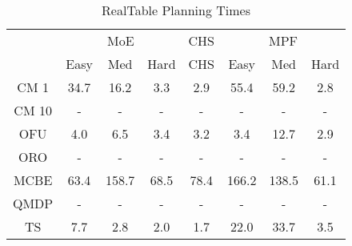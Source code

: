 \begin{table}[]
\centering
\begin{tabular}{|c|c|c|c|c|c|c|c|}
\hline
& \multicolumn{3}{c|}{MoE} & CHS & \multicolumn{3}{c|}{MPF} 
 \\ 
 & Easy & Med & Hard & CHS & Easy & Med & Hard\\\hline
CM 1 &  34.7 &  16.2 &   3.3 &   2.9 &  55.4 &  59.2 &   2.8\\
\hline
CM 10 & - & - & - & - & - & - & -\\
\hline
OFU &   4.0 &   6.5 &   3.4 &   3.2 &   3.4 &  12.7 &   2.9\\
\hline
ORO & - & - & - & - & - & - & -\\
\hline
MCBE &  63.4 & 158.7 &  68.5 &  78.4 & 166.2 & 138.5 &  61.1\\
\hline
QMDP & - & - & - & - & - & - & -\\
\hline
TS &   7.7 &   2.8 &   2.0 &   1.7 &  22.0 &  33.7 &   3.5\\
\hline
\end{tabular}
\caption{RealTable Planning Times}
\label{tab:experiment_RealTable_time}
\end{table}
